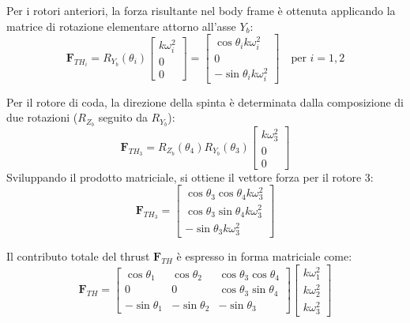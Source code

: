 Per i rotori anteriori, la forza risultante nel body frame è ottenuta applicando la matrice di rotazione elementare attorno all'asse $Y_b$:
\begin{equation}
    \bm{F}_{TH_{i}} = R_{Y_b}(\theta_i) \begin{bmatrix} k\omega_i^2 \\ 0 \\ 0 \end{bmatrix} = 
    \begin{bmatrix} 
        \cos\theta_i k\omega_i^2 \\ 
        0 \\ 
        -\sin\theta_i k\omega_i^2 
    \end{bmatrix} \quad \text{per } i=1,2 \label{eq:F_TH_anteriori}
\end{equation}

Per il rotore di coda, la direzione della spinta è determinata dalla composizione di due rotazioni ($R_{Z_b}$ seguito da $R_{Y_b}$):
\begin{equation}
    \bm{F}_{TH_{3}} = R_{Z_b}(\theta_4) R_{Y_b}(\theta_3) \begin{bmatrix} k\omega_3^2 \\ 0 \\ 0 \end{bmatrix} \label{eq:F_TH3_rotazione}
\end{equation}
Sviluppando il prodotto matriciale, si ottiene il vettore forza per il rotore 3:
\begin{equation}
    \bm{F}_{TH_{3}} = \begin{bmatrix} 
        \cos\theta_3 \cos\theta_4 k\omega_3^2 \\ 
        \cos\theta_3 \sin\theta_4 k\omega_3^2 \\ 
        -\sin\theta_3 k\omega_3^2 
    \end{bmatrix} \label{eq:F_TH3_finale}
\end{equation}

Il contributo totale del thrust $\bm{F}_{TH}$ è espresso in forma matriciale come:
\begin{equation}
    \bm{F}_{TH} = \begin{bmatrix} 
        \cos\theta_1 & \cos\theta_2 & \cos\theta_3 \cos\theta_4 \\ 
        0 & 0 & \cos\theta_3 \sin\theta_4 \\ 
        -\sin\theta_1 & -\sin\theta_2 & -\sin\theta_3 
    \end{bmatrix} \begin{bmatrix} k\omega_1^2 \\ k\omega_2^2 \\ k\omega_3^2 \end{bmatrix}
    \label{eq:F_th}
\end{equation}


